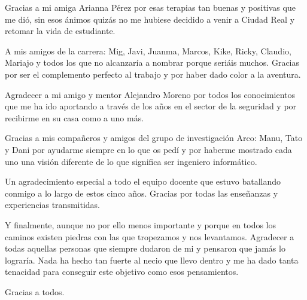 Gracias a mi amiga Arianna Pérez por esas terapias tan buenas y positivas que me dió, sin esos ánimos quizás no me hubiese decidido a venir a Ciudad Real y retomar la vida de estudiante.

A mis amigos de la carrera: Mig, Javi, Juanma, Marcos, Kike, Ricky, Claudio, Mariajo  y todos los que no alcanzaría a nombrar porque seriáis muchos. Gracias por ser el complemento perfecto al trabajo y por haber dado color a la aventura. 

Agradecer a mi amigo y mentor Alejandro Moreno por todos los conocimientos que me ha ido aportando a través de los años en el sector de la seguridad y por recibirme en su casa como a uno más.

Gracias a mis compañeros y amigos del grupo de investigación Arco: Manu, Tato y Dani por ayudarme siempre en lo que os pedí y por haberme mostrado cada uno una visión diferente de lo que significa ser ingeniero informático.

Un agradecimiento especial a todo el equipo docente que estuvo batallando conmigo a lo largo de estos cinco años. Gracias por todas las enseñanzas y experiencias transmitidas.

Y finalmente, aunque no por ello menos importante y porque en todos los caminos existen piedras con las que tropezamos y nos levantamos. Agradecer a todas aquellas personas que siempre dudaron de mi y pensaron que jamás lo lograría. Nada ha hecho tan fuerte al necio que llevo dentro y me ha dado tanta tenacidad para conseguir este objetivo como esos pensamientos.

Gracias a todos.

